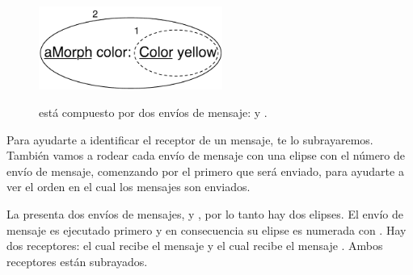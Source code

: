 \documentclass[a4paper,10pt,twoside]{book}
\begin{document}
\begin{figure}[htb]
\begin{minipage}{0.43\textwidth}
\begin{center}
		{\includegraphics[width=6cm]{uKeyUnOne}}
    \caption{ est\'a compuesto por dos env\'ios de mensaje:  y .}
	\end{center}
\end{minipage}
\end{figure}



Para ayudarte a identificar el receptor de un mensaje, te lo subrayaremos.
Tambi\'en vamos a rodear cada env\'io de mensaje con una elipse con el n\'umero de env\'io de mensaje, comenzando por el primero que ser\'a enviado, para ayudarte a ver el orden en el cual los mensajes son enviados.


La  presenta dos env\'ios de mensajes,  y , por lo tanto hay dos elipses. El env\'io de mensaje  es ejecutado primero y en consecuencia su elipse es numerada con .  Hay dos receptores:  el cual recibe el mensaje  y  el cual recibe el mensaje . Ambos receptores est\'an subrayados.
\end{document}
